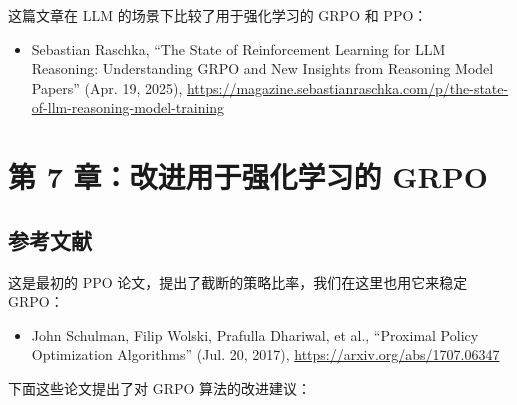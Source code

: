 这篇文章在 LLM 的场景下比较了用于强化学习的 GRPO 和 PPO：

\begin{itemize}
\item Sebastian Raschka, “The State of Reinforcement Learning for LLM Reasoning: Understanding GRPO and New Insights from Reasoning Model Papers” (Apr. 19, 2025), \href{https://magazine.sebastianraschka.com/p/the-state-of-llm-reasoning-model-training}{https://magazine.sebastianraschka.com/p/the-state-of-llm-reasoning-model-training}
\end{itemize}

\section{第 7 章：改进用于强化学习的 GRPO}

\subsection{参考文献}

这是最初的 PPO 论文，提出了截断的策略比率，我们在这里也用它来稳定 GRPO：

\begin{itemize}
\item John Schulman, Filip Wolski, Prafulla Dhariwal, et al., “Proximal Policy Optimization Algorithms” (Jul. 20, 2017), \href{https://arxiv.org/abs/1707.06347}{https://arxiv.org/abs/1707.06347}
\end{itemize}

下面这些论文提出了对 GRPO 算法的改进建议：

